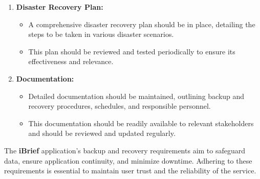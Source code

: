 \begin{enumerate}
    \item \textbf{Disaster Recovery Plan:}
    \begin{itemize}
        \item A comprehensive disaster recovery plan should be in place, detailing the steps to be taken in various disaster scenarios.
        \item This plan should be reviewed and tested periodically to ensure its effectiveness and relevance.
    \end{itemize}
    
    \item \textbf{Documentation:}
    \begin{itemize}
        \item Detailed documentation should be maintained, outlining backup and recovery procedures, schedules, and responsible personnel.
        \item This documentation should be readily available to relevant stakeholders and should be reviewed and updated regularly.
    \end{itemize}
\end{enumerate}

The \textbf{iBrief} application's backup and recovery requirements aim to safeguard data, ensure application continuity, and minimize downtime. Adhering to these requirements is essential to maintain user trust and the reliability of the service.
